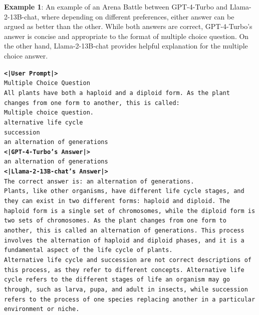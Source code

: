 \documentclass{article}
\begin{document}
\textbf{Example 1}: An example of an Arena Battle between GPT-4-Turbo and Llama-2-13B-chat, where depending on different preferences, either answer can be argued as better than the other. While both answers are correct, GPT-4-Turbo's answer is concise and appropriate to the format of multiple choice question. On the other hand, Llama-2-13B-chat provides helpful explanation for the multiple choice answer.
\begin{tcolorbox}
\texttt{\textbf{<|User Prompt|>}} \\
\texttt{Multiple Choice Question \\
All plants have both a haploid and a diploid form. As the plant changes from one form to another, this is called:} \\

\texttt{Multiple choice question.\\
alternative life cycle\\
succession\\
an alternation of generations} \\

\texttt{\textbf{<|GPT-4-Turbo's Answer|>} \\
an alternation of generations}\\

\texttt{\textbf{<|Llama-2-13B-chat's Answer|>} \\
The correct answer is: an alternation of generations. }\\

\texttt{Plants, like other organisms, have different life cycle stages, and they can exist in two different forms: haploid and diploid. The haploid form is a single set of chromosomes, while the diploid form is two sets of chromosomes. As the plant changes from one form to another, this is called an alternation of generations. This process involves the alternation of haploid and diploid phases, and it is a fundamental aspect of the life cycle of plants.}\\

\texttt{Alternative life cycle and succession are not correct descriptions of this process, as they refer to different concepts. Alternative life cycle refers to the different stages of life an organism may go through, such as larva, pupa, and adult in insects, while succession refers to the process of one species replacing another in a particular environment or niche.}
\end{tcolorbox}
\end{document}
